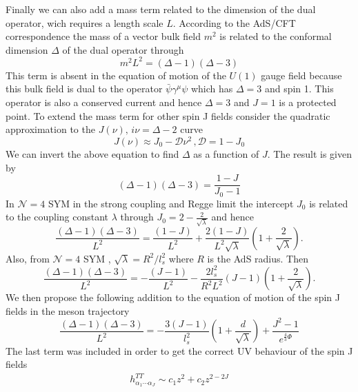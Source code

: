\documentclass[10 pt]{article}
\begin{document}
Finally we can also add a mass term related to the dimension of the dual operator, wich requires a length scale $L$. According to the AdS/CFT correspondence the mass of a vector bulk field $m^2$ is related to the conformal dimension $\Delta$ of the dual operator through
\begin{equation}
m^2 L^2 = \left(\Delta - 1 \right) \left(\Delta - 3 \right)
\end{equation}
This term is absent in the equation of motion of the $U\left(1\right)$ gauge field because this bulk field is dual to the operator $\bar{\psi} \gamma^\mu \psi$ which has $\Delta = 3$ and spin 1. This operator is also a conserved current and hence $\Delta = 3$ and $J = 1$ is a protected point. To extend the mass term for other spin J fields consider the quadratic approximation to the $J\left(\nu\right), \, i \nu = \Delta - 2$ curve
\begin{equation}
J\left(\nu\right) \approx J_0 - \mathcal{D} \nu^2\, , \mathcal{D} = 1 - J_0
\end{equation}
We can invert the above equation to find $\Delta$ as a function of $J$.  The result is given by
\begin{equation}
\left(\Delta -1\right) \left(\Delta - 3 \right) = \frac{1-J}{J_0 - 1}
\end{equation}
In $\mathcal{N} = 4$ SYM in the strong coupling and Regge limit the intercept $J_0$ is related to the coupling constant $\lambda$ through $J_0 = 2 - \frac{2}{\sqrt{\lambda}}$ and hence 
\begin{equation}
\frac{\left(\Delta -1\right) \left(\Delta - 3 \right)}{L^2} = \frac{\left(1-J\right)}{L^2} + \frac{2\left(1-J\right)}{L^2\sqrt{\lambda}}\left(1+\frac{2}{\sqrt{\lambda}}\right).
\end{equation}
Also, from $\mathcal{N} = 4$ SYM , $\sqrt{\lambda} = R^2 / l^2_s$ where $R$ is the AdS radius. Then
\begin{equation}
\frac{\left(\Delta -1\right) \left(\Delta - 3 \right)}{L^2} = -\frac{\left(J-1\right)}{L^2} - \frac{2 l_s^2}{R^2 L^2} \left(J-1\right) \left(1+\frac{2}{\sqrt{\lambda}}\right).
\end{equation}
We then propose the following addition to the equation of motion of the spin J fields in the meson trajectory
\begin{equation}
\frac{\left(\Delta -1\right) \left(\Delta - 3 \right)}{L^2} = -\frac{3\left(J-1\right)}{l_s^2} \left(1+\frac{d}{\sqrt{\lambda}}\right) + \frac{J^2 - 1}{e^{\frac{4}{3}\Phi}}
\end{equation}
The last term was included in order to get the correct UV behaviour of the spin J fields
\begin{align}
h^{TT}_{\alpha_1 \cdots \alpha_J} \sim c_1 z^2 + c_2 z^{2- 2J}
\end{align}
\end{document}
